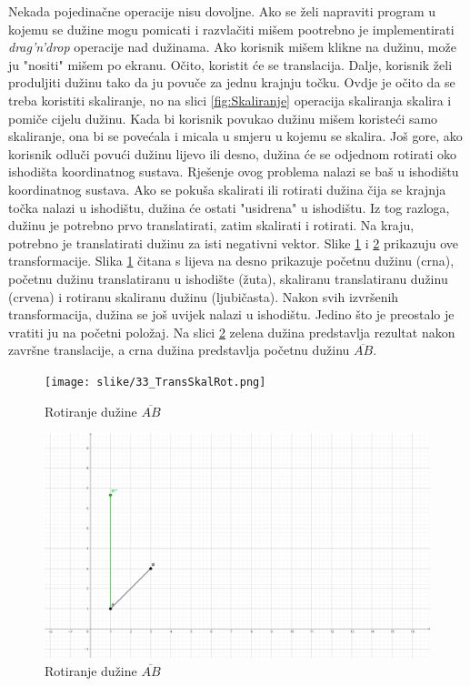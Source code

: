 \documentclass{foi}
\begin{document}
Nekada pojedinačne operacije nisu dovoljne. Ako se želi napraviti program u kojemu se dužine mogu pomicati i razvlačiti mišem pootrebno je implementirati \textit{drag'n'drop} operacije nad dužinama. Ako korisnik mišem klikne na dužinu, može ju "nositi" mišem po ekranu. Očito, koristit će se translacija. Dalje, korisnik želi produljiti dužinu tako da ju povuče za jednu krajnju točku. Ovdje je očito da se treba koristiti skaliranje, no na slici \ref{fig:Skaliranje} operacija skaliranja skalira i pomiče cijelu dužinu. Kada bi korisnik povukao dužinu mišem  koristeći samo skaliranje, ona bi se povećala i micala u smjeru u kojemu se skalira. Još gore, ako korisnik odluči povući dužinu lijevo ili desno, dužina će se odjednom rotirati oko ishodišta koordinatnog sustava. Rješenje ovog problema nalazi se baš u ishodištu koordinatnog sustava. Ako se pokuša skalirati ili rotirati dužina čija se krajnja točka nalazi u ishodištu, dužina će ostati "usidrena" u ishodištu. Iz tog razloga, dužinu je potrebno prvo translatirati, zatim skalirati i rotirati. Na kraju, potrebno je translatirati dužinu za isti negativni vektor. Slike \ref{fig:TransSkalRot} i \ref{fig:TransSkalRotKraj} prikazuju ove transformacije. Slika \ref{fig:TransSkalRot} čitana s lijeva na desno prikazuje početnu dužinu (crna), početnu dužinu translatiranu u ishodište (žuta), skaliranu translatiranu dužinu (crvena) i rotiranu skaliranu dužinu (ljubičasta). Nakon svih izvršenih transformacija, dužina se još uvijek nalazi u ishodištu. Jedino što je preostalo je vratiti ju na početni položaj. Na slici \ref{fig:TransSkalRotKraj} zelena dužina predstavlja rezultat nakon završne translacije, a crna dužina predstavlja početnu dužinu $\overline{AB}$. 


\begin{figure}[H]
	\centering
	\texttt{[image: slike/33\_TransSkalRot.png]}
	\captionsetup{justification=centering}
	\caption{Rotiranje dužine $\overline{AB}$}
	\label{fig:TransSkalRot}
\end{figure}
\begin{figure}[H]
	\centering
	\includegraphics[width=1\textwidth]{slike/34_TransSkalRotKRAJ.png}
	\captionsetup{justification=centering}
	\caption{Rotiranje dužine $\overline{AB}$}
	\label{fig:TransSkalRotKraj}
\end{figure}
\end{document}
